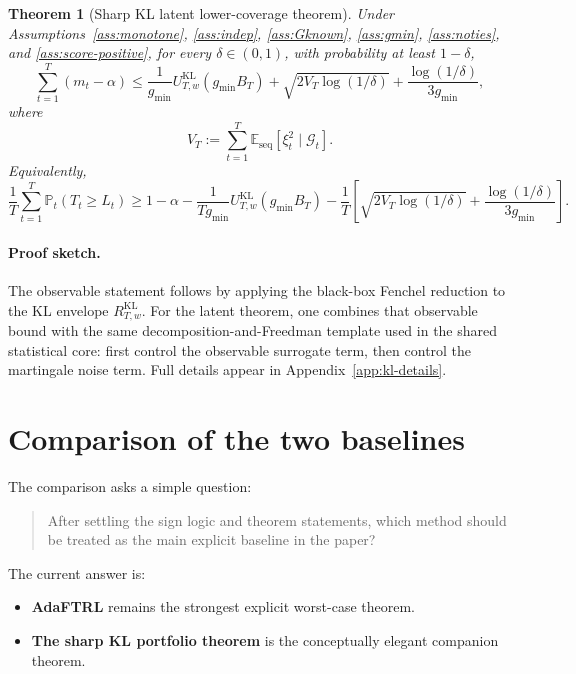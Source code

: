 \documentclass[11pt]{article}
\newtheorem{theorem}{Theorem}
\newcommand{\E}{\mathbb{E}}
\newcommand{\Prob}{\mathbb{P}}
\newcommand{\1}{\mathbf{1}}
\newcommand{\seq}{\mathrm{seq}}
\newcommand{\cG}{\mathcal{G}}
\begin{document}
\begin{theorem}[Sharp KL latent lower-coverage theorem]
\label{thm:kl-latent-main}
Under Assumptions~\ref{ass:monotone}, \ref{ass:indep}, \ref{ass:Gknown}, \ref{ass:gmin}, \ref{ass:noties}, and \ref{ass:score-positive}, for every \(\delta\in(0,1)\), with probability at least \(1-\delta\),
\[
\sum_{t=1}^T (m_t-\alpha)
\le
\frac{1}{g_{\min}}U_{T,w}^{\mathrm{KL}}(g_{\min}B_T)
+
\sqrt{2V_T\log(1/\delta)}
+
\frac{\log(1/\delta)}{3g_{\min}},
\]
where
\[
V_T:=\sum_{t=1}^T \E_{\seq}[\xi_t^2\mid \cG_t].
\]
Equivalently,
\[
\frac1T\sum_{t=1}^T \Prob_t(T_t\ge L_t)
\ge
1-\alpha
-
\frac{1}{Tg_{\min}}U_{T,w}^{\mathrm{KL}}(g_{\min}B_T)
-
\frac{1}{T}\left[
\sqrt{2V_T\log(1/\delta)}
+
\frac{\log(1/\delta)}{3g_{\min}}
\right].
\]
\end{theorem}

\paragraph{Proof sketch.}
The observable statement follows by applying the black-box Fenchel reduction to the KL envelope \(R_{T,w}^{\mathrm{KL}}\). For the latent theorem, one combines that observable bound with the same decomposition-and-Freedman template used in the shared statistical core: first control the observable surrogate term, then control the martingale noise term. Full details appear in Appendix~\ref{app:kl-details}.

\section{Comparison of the two baselines}
\label{sec:comparison}

The comparison asks a simple question:

\begin{quote}
After settling the sign logic and theorem statements, which method should be treated as the main explicit baseline in the paper?
\end{quote}

The current answer is:

\begin{itemize}[leftmargin=*,itemsep=2pt]
  \item \textbf{AdaFTRL} remains the strongest explicit worst-case theorem.
  \item \textbf{The sharp KL portfolio theorem} is the conceptually elegant companion theorem.
\end{itemize}
\end{document}
